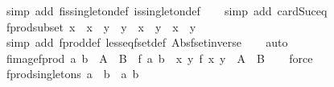 \begin{isabellebody}
\isamarkupfalse%
\ {\isacharparenleft}simp\ add{\isacharcolon}\ fis{\isacharunderscore}singleton{\isacharunderscore}def\ is{\isacharunderscore}singleton{\isacharunderscore}def{\isacharparenright}\isanewline
\ \ \isamarkupfalse%
\ {\isacharparenleft}simp\ add{\isacharcolon}\ card{\isacharunderscore}Suc{\isacharunderscore}eq{\isacharparenright}%
\endisatagproof
{\isafoldproof}%
%
\isadelimproof
\isanewline
%
\endisadelimproof
\isanewline
{}\isamarkupfalse%
\ fprod{\isacharunderscore}subset{\isacharcolon}\ {\isachardoublequoteopen}x\ {\isacharbar}{\isasymsubseteq}{\isacharbar}\ x{\isacharprime}\ {\isasymand}\ y\ {\isacharbar}{\isasymsubseteq}{\isacharbar}\ y{\isacharprime}\ {\isasymLongrightarrow}\ x\ {\isacharbar}{\isasymtimes}{\isacharbar}\ y\ {\isacharbar}{\isasymsubseteq}{\isacharbar}\ x{\isacharprime}\ {\isacharbar}{\isasymtimes}{\isacharbar}\ y{\isacharprime}{\isachardoublequoteclose}\isanewline
%
\isadelimproof
\ \ %
\endisadelimproof
%
\isatagproof
{}\isamarkupfalse%
\ {\isacharparenleft}simp\ add{\isacharcolon}\ fprod{\isacharunderscore}def\ less{\isacharunderscore}eq{\isacharunderscore}fset{\isacharunderscore}def\ Abs{\isacharunderscore}fset{\isacharunderscore}inverse{\isacharparenright}\isanewline
\ \ \isamarkupfalse%
\ auto%
\endisatagproof
{\isafoldproof}%
%
\isadelimproof
\isanewline
%
\endisadelimproof
\isanewline
{}\isamarkupfalse%
\ fimage{\isacharunderscore}fprod{\isacharcolon}\ {\isachardoublequoteopen}{\isacharparenleft}a{\isacharcomma}\ b{\isacharparenright}\ {\isacharbar}{\isasymin}{\isacharbar}\ A\ {\isacharbar}{\isasymtimes}{\isacharbar}\ B\ {\isasymLongrightarrow}\ f\ a\ b\ {\isacharbar}{\isasymin}{\isacharbar}\ {\isacharparenleft}{\isasymlambda}{\isacharparenleft}x{\isacharcomma}\ y{\isacharparenright}{\isachardot}\ f\ x\ y{\isacharparenright}\ {\isacharbar}{\isacharbackquote}{\isacharbar}\ {\isacharparenleft}A\ {\isacharbar}{\isasymtimes}{\isacharbar}\ B{\isacharparenright}{\isachardoublequoteclose}\isanewline
%
\isadelimproof
\ \ %
\endisadelimproof
%
\isatagproof
{}\isamarkupfalse%
\ force%
\endisatagproof
{\isafoldproof}%
%
\isadelimproof
\isanewline
%
\endisadelimproof
\isanewline
{}\isamarkupfalse%
\ fprod{\isacharunderscore}singletons{\isacharcolon}\ {\isachardoublequoteopen}{\isacharbraceleft}{\isacharbar}a{\isacharbar}{\isacharbraceright}\ {\isacharbar}{\isasymtimes}{\isacharbar}\ {\isacharbraceleft}{\isacharbar}b{\isacharbar}{\isacharbraceright}\ {\isacharequal}\ {\isacharbraceleft}{\isacharbar}{\isacharparenleft}a{\isacharcomma}\ b{\isacharparenright}{\isacharbar}{\isacharbraceright}{\isachardoublequoteclose}\isanewline

\end{isabellebody}
